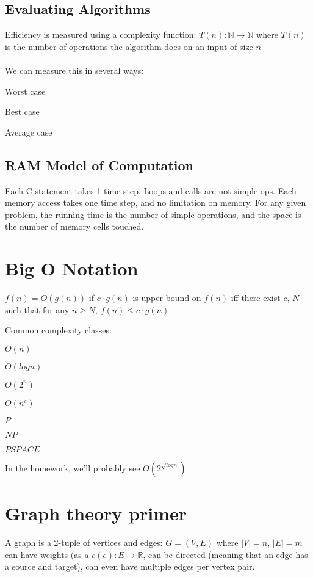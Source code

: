 \documentclass[a4paper]{article}
\newenvironment{itemize*}%
  {\begin{itemize}%
    \setlength{\itemsep}{0pt}%
    \setlength{\parsep}{0pt}%
    \setlength{\parskip}{0pt}}%
  {\end{itemize}}
\newenvironment{enumerate*}%
  {\begin{enumerate}%
    \setlength{\itemsep}{0.5pt}%
    \setlength{\parsep}{0pt}%
    \setlength{\parskip}{0pt}}%
  {\end{enumerate}}
\begin{document}
\subsection{Evaluating Algorithms}
Efficiency is measured using a complexity function:
$T(n): \mathbb{N} \to \mathbb{N}$ where $T(n)$ is the number of operations the algorithm does on an input of size $n$

\paragraph{}
We can measure this in several ways:

\begin{enumerate*}
\item Worst case
\item Best case
\item Average case
\end{enumerate*}

\subsection{RAM Model of Computation}

Each C statement takes 1 time step. Loops and calls are not simple ops. Each memory access takes one time step, and no limitation on memory. For any given problem, the running time is the number of simple operations, and the space is the number of memory cells touched.

\section{Big O Notation}

$f(n) = O(g(n))$ if $c \cdot g(n)$ is upper bound on $f(n)$ iff there exist $c$, $N$ such that for any $n \ge N$, $f(n) \le c \cdot g(n)$

Common complexity classes:
\begin{itemize*}
\item $O(n)$
\item $O(log n)$
\item $O(2^n)$
\item $O(n^c)$
\item $P$
\item $NP$
\item $PSPACE$
\end{itemize*}

In the homework, we'll probably see $O(2^{\sqrt{log n}})$

\section {Graph theory primer}
A graph is a 2-tuple of vertices and edges: $G=(V,E)$ where $|V| = n$, $|E| = m$
can have weights (as a $c(e):E\to\mathbb{R}$, can be directed (meaning that an edge has a source and target), can even have multiple edges per vertex pair.
\end{document}
